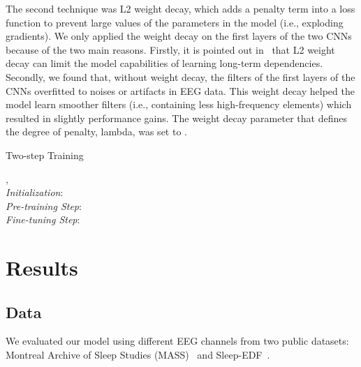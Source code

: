\documentclass[journal,twoside]{IEEEtran}
\let\MYoriglatexcaption\caption
\renewcommand{\caption}[2][\relax]{\MYoriglatexcaption[#2]{#2}}
\begin{document}
The second technique was L2 weight decay, which adds a penalty term into a loss function to prevent large values of the parameters in the model (i.e., exploding gradients). We only applied the weight decay on the first layers of the two CNNs because of the two main reasons. Firstly, it is pointed out in~\cite{pascanu2012} that L2 weight decay can limit the model capabilities of learning long-term dependencies.
Secondly, we found that, without weight decay, the filters of the first layers of the CNNs overfitted to noises or artifacts in EEG data. This weight decay helped the model learn smoother filters (i.e., containing less high-frequency elements) which resulted in slightly performance gains. The weight decay parameter that defines the degree of penalty, lambda, was set to .

\begin{algorithm}[!t]
\caption{Two-step Training}
\label{alg:two_steps}
\begin{algorithmic}[1]
\renewcommand{\algorithmicrequire}{\textbf{Input:}}
\renewcommand{\algorithmicensure}{\textbf{Output:}}
\REQUIRE , 
\ENSURE 
\\ \textit{Initialization}:
\STATE 
\STATE 
\STATE 
\\ \textit{Pre-training Step}:
\STATE 
\ENDFOR
\ENDFOR
\\ \textit{Fine-tuning Step}:
\STATE 
\STATE 
{}
\STATE 
\STATE 
{}
\STATE 
\ENDFOR
\ENDFOR
\ENDFOR
\RETURN 
\end{algorithmic}
\end{algorithm}




\section{Results} \label{sec:results}

\subsection{Data} \label{sec:data}
We evaluated our model using different EEG channels from two public datasets: Montreal Archive of Sleep Studies (MASS)~\cite{oreilly2014} and Sleep-EDF~\cite{goldberger2000,kemp2000}.
\end{document}
